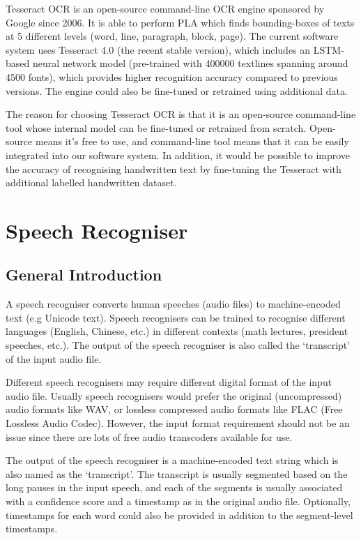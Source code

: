 Tesseract OCR is an open-source command-line OCR engine sponsored by Google since 2006. It is able to perform PLA which finds bounding-boxes of texts at 5 different levels (word, line, paragraph, block, page). The current software system uses Tesseract 4.0 (the recent stable version), which includes an LSTM-based neural network model (pre-trained with 400000 textlines spanning around 4500 fonts), which provides higher recognition accuracy compared to previous versions. The engine could also be fine-tuned or retrained using additional data.

The reason for choosing Tesseract OCR is that it is an open-source command-line tool whose internal model can be fine-tuned or retrained from scratch. Open-source means it's free to use, and command-line tool means that it can be easily integrated into our software system. In addition, it would be possible to improve the accuracy of recognising handwritten text by fine-tuning the Tesseract with additional labelled handwritten dataset.


\section{Speech Recogniser}

\subsection{General Introduction}

A speech recogniser converts human speeches (audio files) to machine-encoded text (e.g Unicode text). Speech recognisers can be trained to recognise different languages (English, Chinese, etc.) in different contexts (math lectures, president speeches, etc.). The output of the speech recogniser is also called the `transcript' of the input audio file.

Different speech recognisers may require different digital format of the input audio file. Usually speech recognisers would prefer the original (uncompressed) audio formats like WAV, or lossless compressed audio formats like FLAC (Free Lossless Audio Codec). However, the input format requirement should not be an issue since there are lots of free audio transcoders available for use.

The output of the speech recogniser is a machine-encoded text string which is also named as the `transcript'. The transcript is usually segmented based on the long pauses in the input speech, and each of the segments is usually associated with a confidence score and a timestamp as in the original audio file. Optionally, timestamps for each word could also be provided in addition to the segment-level timestamps.


